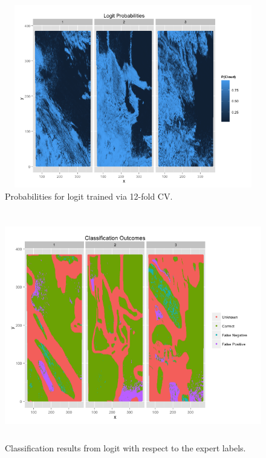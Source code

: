 \documentclass{article}\usepackage[]{graphicx}\usepackage[]{color}
\begin{document}
\begin{figure}[H]
\includegraphics[width = 18cm, height = 8cm]{LogitProbabilities.png}
\caption{Probabilities for logit trained via 12-fold CV.}
\end{figure}

\begin{figure}[H]
\includegraphics[width = 18cm, height = 10cm]{ClassificationOutcomes.png}
\caption{Classification results from logit with respect to the expert labels.}
\end{figure}
\end{document}
